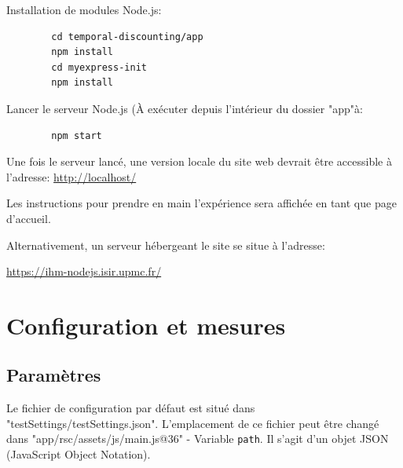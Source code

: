 \documentclass[a4paper, 12pt]{report}
\begin{document}
        Installation de modules Node.js:
        \begin{verbatim}
        cd temporal-discounting/app
        npm install
        cd myexpress-init
        npm install
        \end{verbatim}
        
        Lancer le serveur Node.js (À exécuter depuis l'intérieur du dossier "app"à:
        \begin{verbatim}
        npm start
        \end{verbatim}
        
        
        Une fois le serveur lancé, une version locale du site web devrait être accessible à l'adresse:
        \href{http://localhost/}{http://localhost/}
        
        Les instructions pour prendre en main l'expérience sera affichée en tant que page d'accueil.
        
        Alternativement, un serveur hébergeant le site se situe à l'adresse:
        
        \href{https://ihm-nodejs.isir.upmc.fr/}{https://ihm-nodejs.isir.upmc.fr/}
        \section{Configuration et mesures}
        \subsection{Paramètres}
        Le fichier de configuration par défaut est situé dans "testSettings/testSettings.json". 
        L'emplacement de ce fichier peut être changé dans "app/rsc/assets/js/main.js@36" - Variable \verb+path+. 
        Il s'agit d'un objet JSON (JavaScript Object Notation).
        
\end{document}
